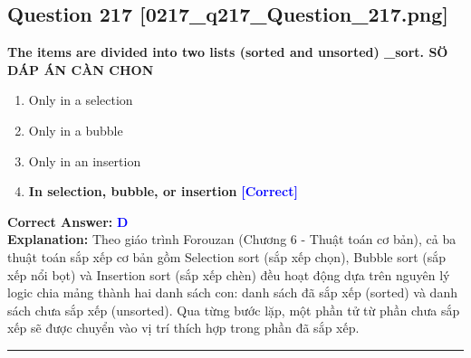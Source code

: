 \documentclass[11pt,a4paper]{article}
\begin{document}
\begin{minipage}{\textwidth}
\subsection*{Question 217 \quad \footnotesize{[0217\_q217\_Question\_217.png]}}
\noindent \textbf{The items are divided into two lists (sorted and unsorted) \_sort. SÖ DÁP ÁN CÀN CHON}

\begin{enumerate}[label=\Alph*.]
    \item Only in a selection
    \item Only in a bubble
    \item Only in an insertion
    \item \textbf{In selection, bubble, or insertion} \hfill \textcolor{blue}{\textbf{[Correct]}}
\end{enumerate}

\noindent \textbf{Correct Answer:} \textcolor{blue}{\textbf{D}} \\[2pt]
\noindent \textbf{Explanation:} Theo giáo trình Forouzan (Chương 6 - Thuật toán cơ bản), cả ba thuật toán sắp xếp cơ bản gồm Selection sort (sắp xếp chọn), Bubble sort (sắp xếp nổi bọt) và Insertion sort (sắp xếp chèn) đều hoạt động dựa trên nguyên lý logic chia mảng thành hai danh sách con: danh sách đã sắp xếp (sorted) và danh sách chưa sắp xếp (unsorted). Qua từng bước lặp, một phần tử từ phần chưa sắp xếp sẽ được chuyển vào vị trí thích hợp trong phần đã sắp xếp.

\par\vspace{0.3cm}
\hrule
\vspace{0.3cm}
\end{minipage}
\end{document}
